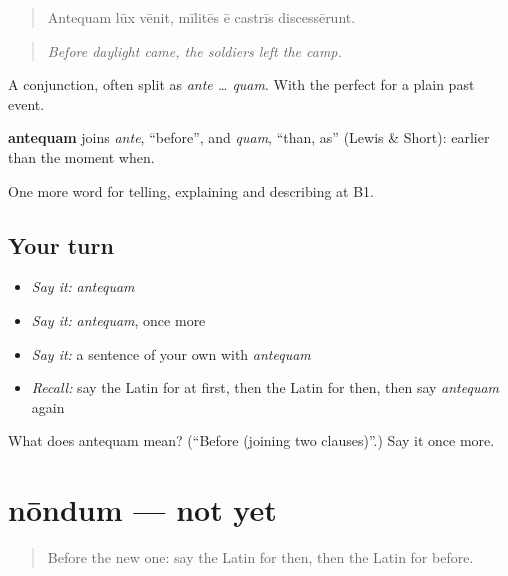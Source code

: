 \begin{quote}
Antequam lūx vēnit, mīlitēs ē castrīs discessērunt.
\end{quote}

\begin{quote}
\emph{Before daylight came, the soldiers left the camp.}
\end{quote}

A conjunction, often split as \emph{ante … quam}. With the perfect for a plain past event.

\begin{cousinweb}
\textbf{antequam} joins \emph{ante}, \textquotedblleft{}before\textquotedblright{}, and \emph{quam}, \textquotedblleft{}than, as\textquotedblright{} (Lewis \& Short): earlier than the moment when.
\end{cousinweb}

\begin{grammarlens}[title={What you've built}]
One more word for telling, explaining and describing at B1.
\end{grammarlens}

\subsection*{Your turn}
\begin{itemize}
\raggedright
  \item \emph{Say it:} \emph{antequam}
  \item \emph{Say it:} \emph{antequam}, once more
  \item \emph{Say it:} a sentence of your own with \emph{antequam}
  \item \emph{Recall:} say the Latin for at first, then the Latin for then, then say \emph{antequam} again
\end{itemize}

\begin{tcolorbox}[breakable,colback=teal!4,colframe=teal!35!black,title={Before you move on}]
What does antequam mean? (\textquotedblleft{}Before (joining two clauses)\textquotedblright{}.) Say it once more.
\end{tcolorbox}
\section[nōndum]{nōndum — not yet}

\label{lesson:LA-C291-nondum}



\begin{quote}
Before the new one: say the Latin for then, then the Latin for before.
\end{quote}

